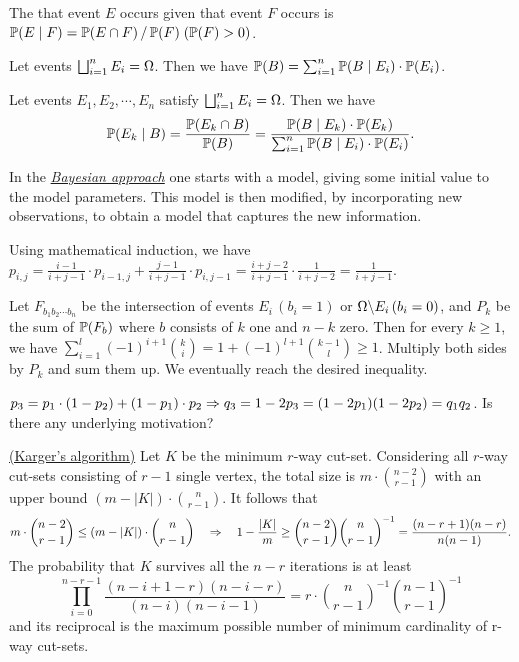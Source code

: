 \documentclass[main.tex]{subfiles}
\begin{document}
The  that event $E$ occurs given that event $F$ occurs is $\mathbb{P}(E \mid F) = \mathbb{P}(E \cap F) \,/\, \mathbb{P}(F)\;(\mathbb{P}(F) > 0)$.

\begin{theorem}
	Let events $\bigsqcup_{i=1}^{n} E_i = \Omega$. Then we have $\mathbb{P}(B) = \sum_{i=1}^{n} \mathbb{P}(B \mid E_i)\cdot \mathbb{P}(E_i)$. 
\end{theorem}

\begin{theorem}
	Let events $E_1,E_2,\cdots,E_n$ satisfy $\bigsqcup_{i=1}^{n} E_i = \Omega$. Then we have
	\[
		\mathbb{P}(E_k \mid B) = \frac{\mathbb{P}(E_k \cap B)}{\mathbb{P}(B)}
		= \frac{\mathbb{P}(B \mid E_k)\cdot \mathbb{P}(E_k)}{\sum_{i=1}^{n}\mathbb{P}(B \mid E_i) \cdot \mathbb{P}(E_i)}.
	\] 
\end{theorem}

In the \href{https://en.wikipedia.org/wiki/Bayesian_inference}{\it Bayesian approach} one starts with a  model, giving some initial value to the model parameters. This model is then modified, by incorporating new observations, to obtain a  model that captures the new information.

\bigskip

Using mathematical induction, we have $p_{i,j} = \frac{i-1}{i+j-1}\cdot p_{i-1,j} + \frac{j-1}{i+j-1}\cdot p_{i,j-1} = \frac{i+j-2}{i+j-1}\cdot\frac{1}{i+j-2} = \frac{1}{i+j-1}$.

Let $F_{b_1b_2\cdots b_n}$ be the intersection of events $E_i\,(b_i=1)$ or $\Omega\backslash E_i\,(b_i=0)$, and $P_{k}$ be the sum of $\mathbb{P}(F_b)$ where $b$ consists of $k$ one and $n-k$ zero. Then for every $k \ge 1$, we have $\sum_{i=1}^{l}(-1)^{i+1}\binom{k}{i} = 1 + (-1)^{l+1}\binom{k-1}{l} \ge 1$. Multiply both sides by $P_k$ and sum them up. We eventually reach the desired inequality.

$p_3 = p_1\cdot (1-p_2) + (1-p_1) \cdot p_2 \Rightarrow q_3 = 1-2p_3 = (1-2p_1)(1-2p_2) = q_1q_2$. Is there any underlying motivation?

 \href{https://en.wikipedia.org/wiki/Karger's_algorithm}{(Karger's algorithm)} Let $K$ be the minimum $r$-way cut-set. Considering all $r$-way cut-sets consisting of $r-1$ single vertex, the total size is $m\cdot \binom{n-2}{r-1}$ with an upper bound $(m-|K|)\cdot \binom{n}{r-1}$. It follows that
	\[
	m \cdot \binom{n-2}{r-1} \le (m-|K|)\cdot \binom{n}{r-1} \quad\Rightarrow\quad 1-\frac {|K|}{m} \ge \binom{n-2}{r-1}\binom n{r-1}^{-1}=\frac{(n-r+1)(n-r)}{n(n-1)}.
	\]
The probability that $K$ survives all the $n-r$ iterations is at least
	\[
		\prod_{i=0}^{n-r-1}\frac{(n-i+1-r)(n-i-r)}{(n-i)(n-i-1)} = r\cdot \binom{n}{r-1}^{-1}\binom{n-1}{r-1}^{-1}
	\]
and its reciprocal is the maximum possible number of minimum cardinality of r-way cut-sets.
\end{document}
